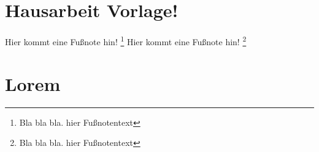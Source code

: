 \documentclass{Hausarbeit}
\begin{document}
    \section{Hausarbeit Vorlage!}

    Hier kommt eine Fußnote hin! \footnote{Bla bla bla. hier Fußnotentext}
    Hier kommt eine Fußnote hin! \footnote{Bla bla bla. hier Fußnotentext}

    \blindtext
    
    \blindtext

    \blindtext

    \newpage

    \section{Lorem}

    \blindtext
    
    \blindtext

    \blindtext
\end{document}
